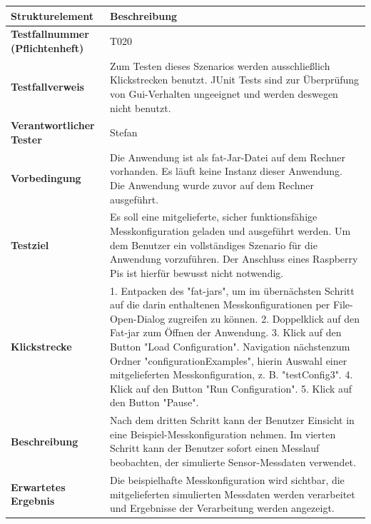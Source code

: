 \documentclass[parskip=full]{scrartcl}
\begin{document}
\begin{table}[h]
	\begin{tabular}{| p{4cm} | p{10cm} |}
		\hline
		\textbf{Strukturelement} & \textbf{Beschreibung} \\ \hline
		\textbf{Testfallnummer (Pflichtenheft)}
		& 
		T020
		\\ \hline
		
		\textbf{Testfallverweis}
		& 
		Zum Testen dieses Szenarios werden ausschließlich Klickstrecken benutzt. JUnit Tests sind zur Überprüfung von Gui-Verhalten ungeeignet und werden deswegen nicht benutzt.
		\\ \hline
		
		
		\textbf{Verantwortlicher Tester}
		& 
		Stefan
		\\ \hline
		
		
		\textbf{Vorbedingung}
		& 
		Die Anwendung ist als fat-Jar-Datei auf dem Rechner vorhanden. Es läuft keine Instanz dieser Anwendung. Die Anwendung wurde zuvor auf dem Rechner ausgeführt.
		\\ \hline
		
		\textbf{ Testziel}
		& 
		Es soll eine mitgelieferte, sicher funktionsfähige Messkonfiguration geladen und ausgeführt werden. Um dem Benutzer ein vollständiges Szenario für die Anwendung vorzuführen. Der Anschluss eines Raspberry Pis ist hierfür bewusst nicht notwendig. 
		
		\\ \hline
		
		\textbf{Klickstrecke}
		& 
		1. Entpacken des "fat-jars", um im übernächsten Schritt auf die darin enthaltenen Messkonfigurationen per File-Open-Dialog zugreifen zu können. 2. Doppelklick auf den Fat-jar zum Öffnen der Anwendung. 3. Klick auf den Button "Load Configuration". Navigation nächstenzum Ordner "configurationExamples", hierin Auswahl einer mitgelieferten Messkonfiguration, z. B. "testConfig3".
		4. Klick auf den Button "Run Configuration". 5. Klick auf 
		den Button "Pause".
		\\ \hline
		
		
		\textbf{Beschreibung}
		& 
		Nach dem dritten Schritt kann der Benutzer Einsicht in eine Beispiel-Messkonfiguration nehmen. Im vierten Schritt
		kann der Benutzer sofort einen Messlauf beobachten, der simulierte Sensor-Messdaten verwendet.
		\\ \hline
		
		\textbf{Erwartetes Ergebnis}
		& 
		Die beispielhafte Messkonfiguration wird sichtbar, die mitgelieferten
		simulierten Messdaten werden verarbeitet und Ergebnisse
		der Verarbeitung werden angezeigt.
		\\ \hline
		

\end{tabular}
\end{table}
\end{document}
